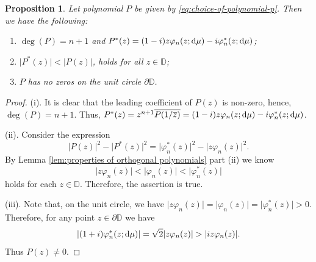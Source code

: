 \documentclass[reqno, a4paper]{amsart}
\renewcommand{\d}{\text{\rm d}}
\newcommand{\dD}{\partial\mathbb{D}}
\theoremstyle{plain}
\newtheorem{proposition}[theorem]{Proposition}
\theoremstyle{definition}
\theoremstyle{remarkstyle}
\numberwithin{equation}{section}
\begin{document}
\begin{proposition}\label{prop:polynomial-properties-for-trivial-measures}
    Let polynomial $P$ be given by \eqref{eq:choice-of-polynomial-p}. Then we have the following: 
    \begin{enumerate}[label=\textnormal{(\roman*)}]
        \item $\deg(P)=n+1$ and $P^*(z)=(1-i) z \varphi_{n}(z;\d\mu) - i \varphi_{n}^*(z;\d\mu)$;
        \item $\lvert P^*(z)\rvert < \lvert P(z)\rvert $, holds for all $z\in \mathbb{D}$;
        \item $P$ has no zeros on the unit circle $\dD$.
    \end{enumerate}
\end{proposition}
\begin{proof}
    (i). It is clear that the leading coefficient of $P(z)$ is non-zero, hence, $\deg(P)=n+1$. Thus, $P^*(z)=z^{n+1}\overline{P(1/\overline{z})}=(1-i) z \varphi_{n}(z;\d\mu) - i \varphi_{n}^*(z;\d\mu)$.

    (ii). Consider the expression 
    \begin{equation*}
        \lvert P(z)\rvert^2-\lvert P^*(z)\rvert^2=\lvert \varphi_n^*(z)\rvert^2-\lvert z \varphi_n(z)\rvert^2.
    \end{equation*}
    By Lemma \ref{lem:properties of orthogonal polynomials} part (ii) we know 
    \begin{equation*}
        \lvert z \varphi_n(z)\rvert<\lvert \varphi_n(z)\rvert<\lvert \varphi_n^*(z)\rvert
    \end{equation*}
     holds for each $z\in \mathbb{D}$. Therefore, the assertion is true.

     (iii). Note that, on the unit circle, we have $ \lvert z \varphi_n(z)\rvert=\lvert \varphi_n(z)\rvert=\lvert \varphi_n^*(z)\rvert>0$. Therefore, for any point $z\in \dD$ we have 
     \begin{equation*}
         \lvert (1+i)\varphi_{n}^*(z;\d\mu)\rvert = \sqrt{2}\lvert z\varphi_n(z)\rvert>\lvert i z \varphi_n(z)\rvert.
     \end{equation*}
     Thus $P(z)\neq 0$.
\end{proof}
\end{document}
